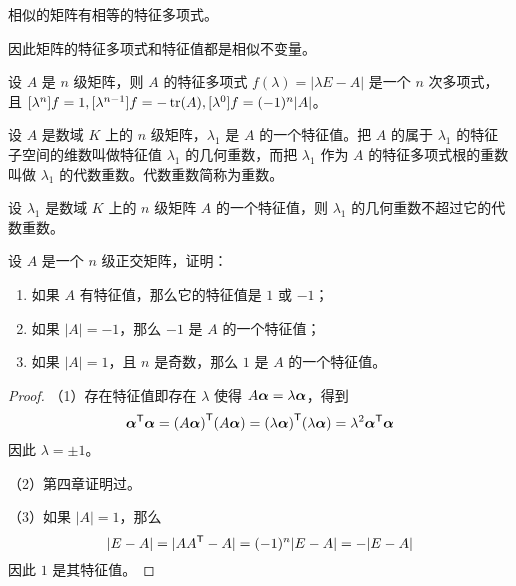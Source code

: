 \begin{theorem}
	相似的矩阵有相等的特征多项式。
\end{theorem}

因此矩阵的特征多项式和特征值都是相似不变量。

\begin{theorem}
	设 $A$ 是 $n$ 级矩阵，则 $A$ 的特征多项式 $f(\lambda) = |\lambda E - A|$ 是一个 $n$ 次多项式，且 $[\lambda^n]f = 1, [\lambda^{n-1}]f = -\operatorname{tr}(A), [\lambda^0] f = (-1)^n |A|$。
\end{theorem}

\begin{definition}
	设 $A$ 是数域 $K$ 上的 $n$ 级矩阵，$\lambda_1$ 是 $A$ 的一个特征值。把 $A$ 的属于 $\lambda_1$ 的特征子空间的维数叫做特征值 $\lambda_1$ 的几何重数，而把 $\lambda_1$ 作为 $A$ 的特征多项式根的重数叫做 $\lambda_1$ 的代数重数。代数重数简称为重数。 
\end{definition}

\begin{theorem}
	设 $\lambda_1$ 是数域 $K$ 上的 $n$ 级矩阵 $A$ 的一个特征值，则 $\lambda_1$ 的几何重数不超过它的代数重数。
\end{theorem}

\begin{example}
	设 $A$ 是一个 $n$ 级正交矩阵，证明：
	
	\begin{enumerate}
		\item 如果 $A$ 有特征值，那么它的特征值是 $1$ 或 $-1$；
		\item 如果 $|A| = -1$，那么 $-1$ 是 $A$ 的一个特征值；
		\item 如果 $|A| = 1$，且 $n$ 是奇数，那么 $1$ 是 $A$ 的一个特征值。
	\end{enumerate}
\end{example}

\begin{proof}
	（1）存在特征值即存在 $\lambda$ 使得 $A \boldsymbol{\alpha} = \lambda \boldsymbol{\alpha}$，得到
	\[ {\boldsymbol{\alpha}}^\mathsf{T}\boldsymbol{\alpha} = {(A \boldsymbol{\alpha})}^\mathsf{T}(A \boldsymbol{\alpha}) = {(\lambda \boldsymbol{\alpha})}^\mathsf{T}(\lambda \boldsymbol{\alpha}) = \lambda^2  {\boldsymbol{\alpha}}^\mathsf{T}\boldsymbol{\alpha} \]
	因此 $\lambda = \pm 1$。
	
	（2）第四章证明过。
	
	（3）如果 $|A| = 1$，那么
	\[ |E - A| = |A {A}^\mathsf{T} - A| = (-1)^n |E - A| = - |E-A| \]
	因此 $1$ 是其特征值。
\end{proof}

